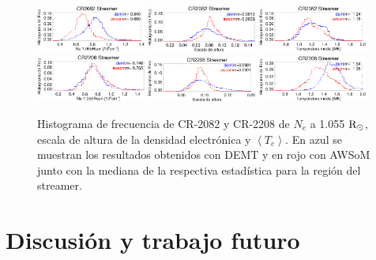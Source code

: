 \documentclass[baaa]{baaa}
\begin{document}
\begin{figure}[h!]
  \centering
  \includegraphics[width=0.32\textwidth]{figuras/proceeding_2082_demt_awsom_streamer_ne_1055.eps}
  \includegraphics[width=0.32\textwidth]{figuras/proceeding_2082_demt_awsom_streamer_lambda_n.eps}  
  \includegraphics[width=0.32\textwidth]{figuras/proceeding_2082_demt_awsom_streamer_Tm.eps}\\
  \includegraphics[width=0.32\textwidth]{figuras/proceeding_2208_demt_awsom_streamer_ne_1055.eps}
  \includegraphics[width=0.32\textwidth]{figuras/proceeding_2208_demt_awsom_streamer_lambda_n.eps}
  \includegraphics[width=0.32\textwidth]{figuras/proceeding_2208_demt_awsom_streamer_Tm.eps}
  \caption{Histograma de frecuencia de CR-2082 y CR-2208 de $N_e$ a 1.055 ${\rm R_\odot}$, escala de altura de la densidad electrónica y $\left<T_e\right>$. En azul se muestran los resultados obtenidos con DEMT y en rojo con AWSoM junto con la mediana de la respectiva estadística para la región del streamer.}
  \label{fig-histos}
\end{figure}


\section{Discusión y trabajo futuro}
\end{document}
